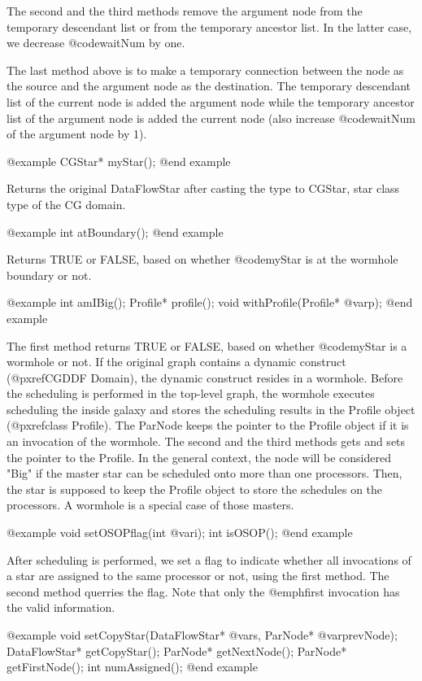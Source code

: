The second and the third methods remove the argument node from the
temporary descendant list or from the temporary ancestor list. In the latter
case, we decrease @code{waitNum} by one.

The last method above is to make a temporary connection between the 
node as the source and the argument node as the destination. The temporary
descendant list of the current node is added the argument node while the
temporary ancestor list of the argument node is added the current node (also
increase @code{waitNum} of the argument node by 1).

@example
CGStar* myStar();
@end example

Returns the original DataFlowStar after casting the type to CGStar, star
class type of the CG domain.

@example
int atBoundary();
@end example

Returns TRUE or FALSE, based on whether @code{myStar} is at the wormhole
boundary or not.

@example
int amIBig();
Profile* profile();
void withProfile(Profile* @var{p});
@end example

The first method returns TRUE or FALSE, based on whether @code{myStar} is
a wormhole or not. If the original graph contains a dynamic construct
(@pxref{CGDDF Domain}), the dynamic construct resides in a wormhole.
Before the scheduling is performed in the top-level graph, the wormhole
executes scheduling the inside galaxy and stores the scheduling results
in the Profile object (@pxref{class Profile}). The ParNode keeps the pointer
to the Profile object if it is an invocation of the wormhole. The second
and the third methods gets and sets the pointer to the Profile. In the
general context, the node will be considered "Big" if the master star
can be scheduled onto more than one processors. Then, the star
is supposed to keep the Profile object to store the schedules on the
processors. A wormhole is a special case of those masters.

@example
void setOSOPflag(int @var{i});
int isOSOP();
@end example

After scheduling is performed, we set a flag to indicate whether all
invocations of a star are assigned to the same processor or not, using the
first method. The second method querries the flag. Note that only the
@emph{first} invocation has the valid information.

@example
void setCopyStar(DataFlowStar* @var{s}, ParNode* @var{prevNode});
DataFlowStar* getCopyStar();
ParNode* getNextNode();
ParNode* getFirstNode();
int numAssigned();
@end example

